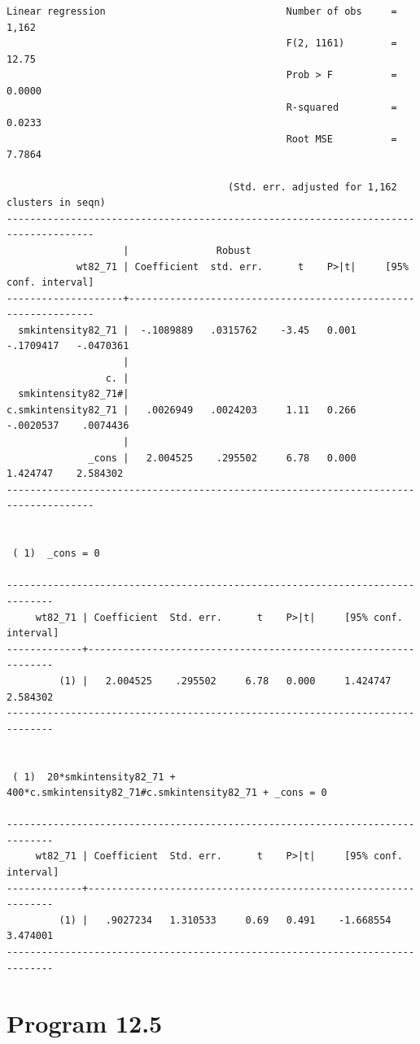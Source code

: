 \documentclass[
  10pt,
  a4paper,
]{book}
\begin{document}
\begin{verbatim}
Linear regression                               Number of obs     =      1,162
                                                F(2, 1161)        =      12.75
                                                Prob > F          =     0.0000
                                                R-squared         =     0.0233
                                                Root MSE          =     7.7864

                                      (Std. err. adjusted for 1,162 clusters in seqn)
-------------------------------------------------------------------------------------
                    |               Robust
            wt82_71 | Coefficient  std. err.      t    P>|t|     [95% conf. interval]
--------------------+----------------------------------------------------------------
  smkintensity82_71 |  -.1089889   .0315762    -3.45   0.001    -.1709417   -.0470361
                    |
                 c. |
  smkintensity82_71#|
c.smkintensity82_71 |   .0026949   .0024203     1.11   0.266    -.0020537    .0074436
                    |
              _cons |   2.004525    .295502     6.78   0.000     1.424747    2.584302
-------------------------------------------------------------------------------------


 ( 1)  _cons = 0

------------------------------------------------------------------------------
     wt82_71 | Coefficient  Std. err.      t    P>|t|     [95% conf. interval]
-------------+----------------------------------------------------------------
         (1) |   2.004525    .295502     6.78   0.000     1.424747    2.584302
------------------------------------------------------------------------------


 ( 1)  20*smkintensity82_71 + 400*c.smkintensity82_71#c.smkintensity82_71 + _cons = 0

------------------------------------------------------------------------------
     wt82_71 | Coefficient  Std. err.      t    P>|t|     [95% conf. interval]
-------------+----------------------------------------------------------------
         (1) |   .9027234   1.310533     0.69   0.491    -1.668554    3.474001
------------------------------------------------------------------------------
\end{verbatim}

\section{Program 12.5}\label{program-12.5-1}
\end{document}
